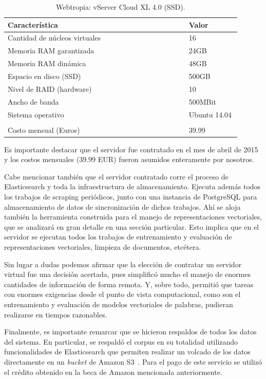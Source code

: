 \begin{table}[h]
    \centering
    \begin{tabular}{p{0.70\linewidth}p{0.20\linewidth}}
        \hline
        Característica & Valor\\
        \hline
        Cantidad de núcleos virtuales & 16\\
        Memoria RAM garantizada & 24GB\\
        Memoria RAM dinámica & 48GB\\
        Espacio en disco (SSD) & 500GB\\
        Nivel de RAID (hardware) & 10\\
        Ancho de banda & 500MBit\\
        Sistema operativo & Ubuntu 14.04\\
        \\
        Costo mensual (Euros) & 39.99\\
        \hline
    \end{tabular}
    \caption{Webtropia: vServer Cloud XL 4.0 (SSD).}
    \label{table:webtropia}
\end{table}

Es importante destacar que el servidor fue contratado en el mes de abril de 2015 y los costos mensuales
($39.99$ EUR) fueron asumidos enteramente por nosotros.

Cabe mencionar también que el servidor contratado corre el proceso de Elasticsearch y toda la
infraestructura de almacenamiento. Ejecuta además todos los trabajos de scraping periódicos, junto con
una instancia de PostgreSQL para almacenamiento de datos de sincronización de dichos trabajos. Ahí se
aloja también la herramienta construida para el manejo de representaciones vectoriales, que se analizará en
gran detalle en una sección particular. Esto implica que en el servidor se ejecutan todos los trabajos de
entrenamiento y evaluación de representaciones vectoriales, limpieza de documentos, etcétera.

Sin lugar a dudas podemos afirmar que la elección de contratar un servidor virtual fue una decisión
acertada, pues simplificó mucho el manejo de enormes cantidades de información de forma remota. Y, sobre
todo, permitió que tareas con enormes exigencias desde el punto de vista computacional, como son el
entrenamiento y evaluación de modelos vectoriales de palabras, pudieran realizarse en tiempos razonables.

Finalmente, es importante remarcar que se hicieron respaldos de todos los datos del sistema. En particular,
se respaldó el corpus en su totalidad utilizando funcionalidades de Elasticsearch que permiten realizar
un volcado de los datos directamente en un \textit{bucket} de Amazon S3~\cite{AmazonS3}. Para el pago de
este servicio se utilizó el crédito obtenido en la beca de Amazon mencionada anteriormente.

